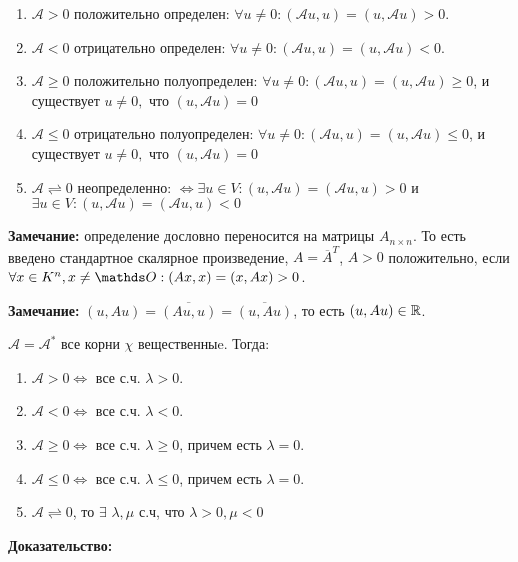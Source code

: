 \begin{enumerate}
    \item $\mathcal{A} > 0$ положительно определен: $\forall u \neq 0: (\mathcal{A}u,u) = (u, \mathcal{A}u)>0$.
     \item $\mathcal{A} < 0$ отрицательно определен: $\forall u \neq 0: (\mathcal{A}u,u) = (u, \mathcal{A}u)<0$.
     \item $\mathcal{A} \geq 0$ положительно полуопределен: $\forall u \neq 0: (\mathcal{A}u,u) = (u, \mathcal{A}u)\geq0$, и существует $u\neq 0,$ что $(u, \mathcal{A}u)=0$
     \item $\mathcal{A} \leq 0$ отрицательно полуопределен: $\forall u \neq 0: (\mathcal{A}u,u) = (u, \mathcal{A}u)\leq0$, и существует $u\neq 0,$ что $(u, \mathcal{A}u)=0$
    \item $\mathcal{A} \rightleftharpoons  0$ неопределенно: $\Leftrightarrow  \exists u \in V: (u,\mathcal{A}u) = (\mathcal{A}u,u) >0$ и  $\exists u \in V: (u,\mathcal{A}u) = (\mathcal{A}u,u)<0$
\end{enumerate}

\textbf{Замечание:} определение дословно переносится на матрицы $A_{n \times n}$. То есть введено стандартное скалярное произведение, $A = \overline{A}^T$, $A>0$ положительно, если $\forall x \in K^n, x \neq \zero: (Ax,x) = (x,Ax) > 0$.

\textbf{Замечание:} $(u,Au) = \overline{(Au, u)} = \overline{(u, Au)}$, то есть  $(u,Au) \in \mathbb{R}$.


$\mathcal{A} = \mathcal{A}^*$ все корни $\chi$ вещественныe. Тогда:

\begin{enumerate}
    \item $\mathcal{A} > 0 \Leftrightarrow$ все с.ч. $\lambda >0$.
     \item $\mathcal{A} < 0 \Leftrightarrow$ все с.ч. $\lambda <0$.
     \item $\mathcal{A} \geq 0 \Leftrightarrow$ все с.ч. $\lambda \geq0$, причем есть $\lambda =0 $.
     \item $\mathcal{A} \leq0 \Leftrightarrow$ все с.ч. $\lambda \leq0$, причем есть $\lambda =0 $.
    \item $\mathcal{A} \rightleftharpoons  0$, то $\exists $ $\lambda,\mu$ с.ч, что $\lambda >0, \mu<0$
\end{enumerate}

\textbf{Доказательство:}


